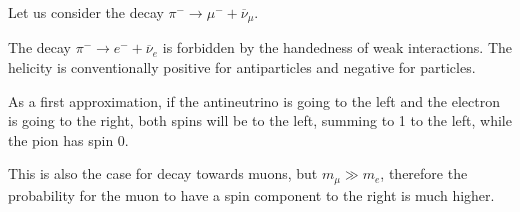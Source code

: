 \documentclass[main.tex]{subfiles}
\begin{document}
Let us consider the decay \(\pi^{-} \to \mu^{-} + \overline{\nu}_\mu \). 

The decay \(\pi^{-} \to e^{-} + \overline{\nu}_e\) is forbidden by the handedness of weak interactions. 
The helicity is conventionally positive for antiparticles and negative for particles. 

As a first approximation, if the antineutrino is going to the left and the electron is going to the right, both spins will be to the left, summing to 1 to the left, while the pion has spin 0. 

This is also the case for decay towards muons, but \(m_\mu \gg m_e\), therefore the probability for the muon to have a spin component to the right is much higher. 
\end{document}
